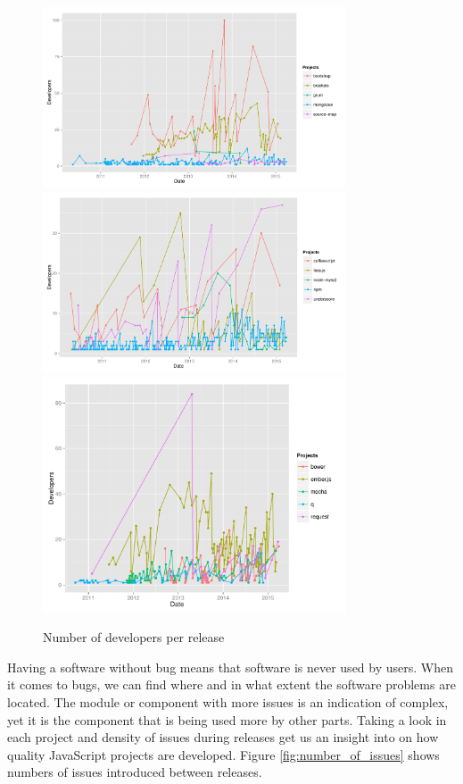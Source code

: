 \begin{figure}[thb!]
	\caption{Number of developers per release}
	\label{fig:number_of_developers}
	\includegraphics[width=90mm,scale=0.5]{figures/number_of_developers}
	\includegraphics[width=90mm,scale=0.5]{figures/number_of_developers_2}
	\includegraphics[width=90mm,scale=0.5]{figures/number_of_developers_3}
\end{figure}

Having a software without bug means that software is never used by users. When it comes to bugs, we can find where and in what extent the software problems are located. The module or component with more issues is an indication of complex, yet it is the component that is being used more by other parts. Taking a look in each project and density of issues during releases get us an insight into on how quality JavaScript projects are developed. Figure \ref{fig:number_of_issues} shows numbers of issues introduced between releases.

